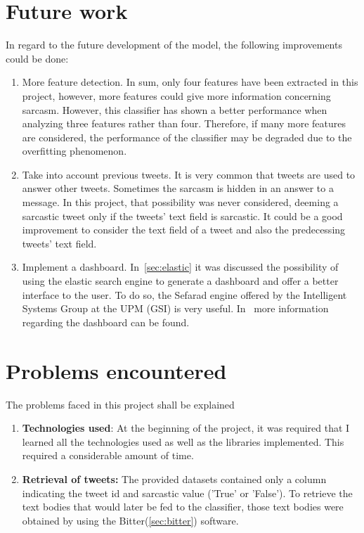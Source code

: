 \section{Future work}
In regard to the future development of the model, the following improvements could be done:
\begin{enumerate}
	\item More feature detection. In sum, only four features have been extracted in this project, however, more features could give more information concerning sarcasm. However, this classifier has shown a better performance when analyzing three features rather than four. Therefore, if many more features are considered, the performance of the classifier may be degraded due to the overfitting phenomenon.
	\item Take into account previous tweets. It is very common that tweets are used to answer other tweets. Sometimes the sarcasm is hidden in an answer to a message. In this project, that possibility was never considered, deeming a sarcastic tweet only if the tweets' text field is sarcastic. It could be a good improvement to consider the text field of a tweet and also the predecessing tweets' text field.
	\item Implement a dashboard. In~\cref{sec:elastic} it was discussed the possibility of using the elastic search engine to generate a dashboard and offer a better interface to the user. To do so, the Sefarad engine offered by the Intelligent Systems Group at the UPM (GSI) is very useful. In~\cite{sefarad} more information regarding the dashboard can be found.
\end{enumerate}
\section{Problems encountered}
The problems faced in this project shall be explained
\begin{enumerate}
	\item \textbf{Technologies used}: At the beginning of the project, it was required that I learned all the technologies used as well as the libraries implemented. This required a considerable amount of time.
	\item \textbf{Retrieval of tweets:} The provided datasets contained only a column indicating the tweet id and sarcastic value ('True' or 'False'). To retrieve the text bodies that would later be fed to the classifier, those text bodies were obtained by using the Bitter(\cref{sec:bitter}) software. 
	
\end{enumerate}


